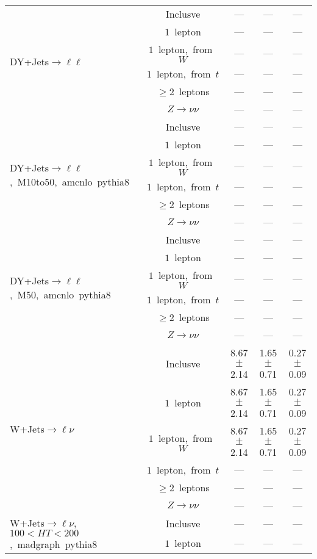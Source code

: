 \documentclass{article}
\begin{document}
\begin{longtable}{|l|c|c|c|c|}
\hline 
\multirow{6}{*}{DY+Jets$\rightarrow\ell\ell$} & Inclusve  & ---  & ---  & --- \\* 
 & $1$~lepton  & ---  & ---  & --- \\* 
 & $1$~lepton,~from~$W$  & ---  & ---  & --- \\* 
 & $1$~lepton,~from~$t$  & ---  & ---  & --- \\* 
 & $\ge2$~leptons  & ---  & ---  & --- \\* 
 & $Z\rightarrow\nu\nu$  & ---  & ---  & --- \\* 
\hline 
\multirow{6}{*}{DY+Jets$\rightarrow\ell\ell$,~M10to50,~amcnlo~pythia8} & Inclusve  & ---  & ---  & --- \\* 
 & $1$~lepton  & ---  & ---  & --- \\* 
 & $1$~lepton,~from~$W$  & ---  & ---  & --- \\* 
 & $1$~lepton,~from~$t$  & ---  & ---  & --- \\* 
 & $\ge2$~leptons  & ---  & ---  & --- \\* 
 & $Z\rightarrow\nu\nu$  & ---  & ---  & --- \\* 
\hline 
\multirow{6}{*}{DY+Jets$\rightarrow\ell\ell$,~M50,~amcnlo~pythia8} & Inclusve  & ---  & ---  & --- \\* 
 & $1$~lepton  & ---  & ---  & --- \\* 
 & $1$~lepton,~from~$W$  & ---  & ---  & --- \\* 
 & $1$~lepton,~from~$t$  & ---  & ---  & --- \\* 
 & $\ge2$~leptons  & ---  & ---  & --- \\* 
 & $Z\rightarrow\nu\nu$  & ---  & ---  & --- \\* 
\hline 
\multirow{6}{*}{W+Jets$\rightarrow\ell\nu$} & Inclusve  & 8.67 $\pm$ 2.14  & 1.65 $\pm$ 0.71  & 0.27 $\pm$ 0.09 \\* 
 & $1$~lepton  & 8.67 $\pm$ 2.14  & 1.65 $\pm$ 0.71  & 0.27 $\pm$ 0.09 \\* 
 & $1$~lepton,~from~$W$  & 8.67 $\pm$ 2.14  & 1.65 $\pm$ 0.71  & 0.27 $\pm$ 0.09 \\* 
 & $1$~lepton,~from~$t$  & ---  & ---  & --- \\* 
 & $\ge2$~leptons  & ---  & ---  & --- \\* 
 & $Z\rightarrow\nu\nu$  & ---  & ---  & --- \\* 
\hline 
\multirow{6}{*}{W+Jets$\rightarrow\ell\nu$,~$100<HT<200$,~madgraph~pythia8} & Inclusve  & ---  & ---  & --- \\* 
 & $1$~lepton  & ---  & ---  & --- \\* 

\end{longtable}
\end{document}
